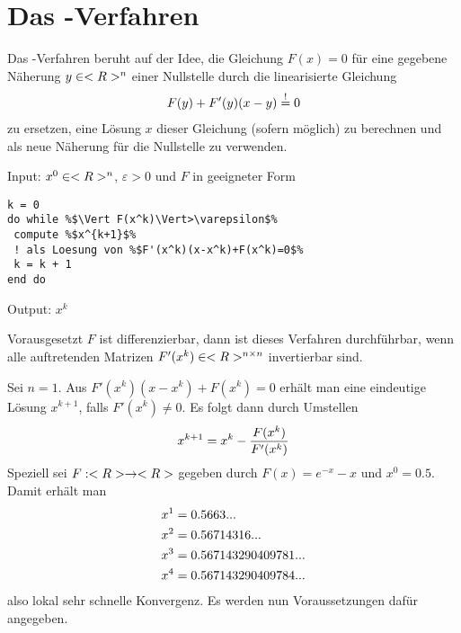 \section{Das -Verfahren}

Das -Verfahren beruht auf der Idee, die Gleichung $F(x) = 0$ für eine gegebene Näherung $y\in<R>^n$ einer Nullstelle durch die linearisierte Gleichung 
\begin{align}
	F(y) + F'(y)(x-y) \overset{!}{=} 0\notag
\end{align}
zu ersetzen, eine Lösung $x$ dieser Gleichung (sofern möglich) zu berechnen und als neue Näherung für die Nullstelle zu verwenden.

\begin{algorithm}
	Input: $x^0\in<R>^n$, $\varepsilon>0$ und $F$ in geeigneter Form
	\begin{lstlisting}
k = 0
do while %$\Vert F(x^k)\Vert>\varepsilon$%
 compute %$x^{k+1}$% 
 ! als Loesung von %$F'(x^k)(x-x^k)+F(x^k)=0$%
 k = k + 1
end do
	\end{lstlisting}
	Output: $x ^k$
\end{algorithm}

Vorausgesetzt $F$ ist differenzierbar, dann ist dieses Verfahren durchführbar, wenn alle auftretenden Matrizen $F'(x ^k)\in<R>^{n\times n}$ invertierbar sind.

\begin{example}
	Sei $n=1$. Aus $F'(x^k)(x-x^k)+F(x^k)=0$ erhält man eine eindeutige Lösung $x^{k+1}$, falls $F'(x^k)\neq 0$. Es folgt dann durch Umstellen
	\begin{align}
		x^{k+1} = x^k - \frac{F(x^k)}{F'(x^k)}\notag
	\end{align}
	Speziell sei $F:<R>\to<R>$ gegeben durch $F(x) = e^{-x}-x$ und $x^0=0.5$. Damit erhält man
	\begin{align}
		x^1 &= 0.5663... \notag \\
		x^2 &= 0.56714316... \notag \\
		x^3 &= 0.567143290409781... \notag \\
		x^4 &= 0.567143290409784... \notag
	\end{align}
	also lokal sehr schnelle Konvergenz. Es werden nun Voraussetzungen dafür angegeben.
\end{example}

